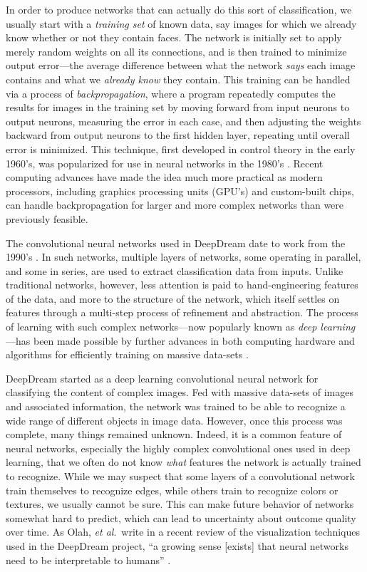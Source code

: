 \documentclass[leqno,12pt]{article}
\begin{document}
In order to produce networks that can actually do this sort of classification, we usually start with a
\emph{training set} of known data, say images for which we already know whether or not they contain faces.
The network is initially set to apply merely random weights on all its connections, and is then trained to
minimize output error---the average difference between what the network \emph{says} each image contains and what
we \emph{already know} they contain.  This training can be handled via a process of \emph{backpropagation},
where a program repeatedly computes the results for images in the training set by moving forward from input
neurons to output neurons, measuring the error in each case, and then adjusting the weights backward from output
neurons to the first hidden layer, repeating until overall error is minimized.  This technique, first developed
in control theory in the early 1960's, was popularized for use in neural networks in the 1980's
\cite{Dreyfus90,Rumelhart86}.  Recent computing advances have made the idea much more practical as modern
processors, including graphics processing units (GPU's) and custom-built chips, can handle backpropagation for
larger and more complex networks than were previously feasible.

The convolutional neural networks used in DeepDream date to work from the 1990's \cite{LeCun98}.  In such
networks, multiple layers of networks, some operating in parallel, and some in series, are used to extract
classification data from inputs.  Unlike traditional networks, however, less attention is paid to
hand-engineering features of the data, and more to the structure of the network, which itself settles on
features through a multi-step process of refinement and abstraction.  The process of learning with such complex
networks---now popularly known as \emph{deep learning}---has been made possible by further advances in both
computing hardware and algorithms for efficiently training on massive data-sets \cite{Goodfellow16,Hinton06}.

DeepDream started as a deep learning convolutional neural network for classifying the content of complex images.
Fed with massive data-sets of images and associated information, the network was trained to be able to recognize
a wide range of different objects in image data.  However, once this process was complete, many things remained
unknown.  Indeed, it is a common feature of neural networks, especially the highly complex convolutional ones
used in deep learning, that we often do not know \emph{what} features the network is actually trained to
recognize.  While we may suspect that some layers of a convolutional network train themselves to recognize
edges, while others train to recognize colors or textures, we usually cannot be sure.  This can make future
behavior of networks somewhat hard to predict, which can lead to uncertainty about outcome quality over time.
As Olah, \emph{et al}.\ write in a recent review of the visualization techniques used in the DeepDream project,
``a growing sense [exists] that neural networks need to be interpretable to humans'' \cite{Olah17}.
\end{document}
